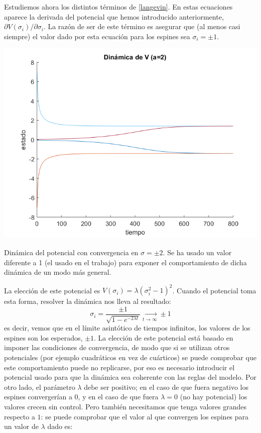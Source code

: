 \documentclass[titlepage,12pt]{article}
\numberwithin{equation}{section}
\begin{document}
	Estudiemos ahora los distintos términos de \eqref{langevin}. En estas ecuaciones aparece la derivada del potencial que hemos introducido anteriormente, ${\partial V(\sigma_i)}/{\partial \sigma_i}$. La razón de ser de este término es asegurar que (al menos casi siempre) el valor dado por esta ecuación para los espines sea $\sigma_i=\pm 1$.
	\begin{center}
	    \includegraphics[scale=0.5]{potencial}\\
	  \begin{small}
	  Dinámica del potencial con convergencia en $\sigma=\pm2$. Se ha usado un valor diferente a 1 (el usado en el trabajo) para exponer el comportamiento de dicha dinámica de un modo más general.
	\end{small}
	\end{center}
	La elección de este potencial es $V(\sigma_i)=\lambda\left(\sigma_i^2-1\right)^2$. Cuando el potencial toma esta forma, resolver la dinámica nos lleva al resultado:
	\begin{displaymath}
	\sigma_i = \frac{\pm 1}{\sqrt{1-e^{-2\lambda t}}} \xrightarrow[t \rightarrow \infty]{}\pm 1
	\end{displaymath}
	es decir, vemos que en el límite asintótico de tiempos infinitos, los valores de los espines son los esperados, $\pm 1$. La elección de este potencial está basado en imponer las condiciones de convergencia, de modo que si se utilizan otros potenciales (por ejemplo cuadráticos en vez de cuárticos) se puede comprobar que este comportamiento puede no replicarse, por eso es necesario introducir el potencial usado para que la dinámica sea coherente con las reglas del modelo. Por otro lado, el parámetro $\lambda$ debe ser positivo; en el caso de que fuera negativo los espines convergerían a $0$, y en el caso de que fuera $\lambda = 0$ (no hay potencial) los valores crecen sin control. Pero también necesitamos que tenga valores grandes respecto a $1$: se puede comprobar que el valor al que convergen los espines para un valor de $\lambda$ dado es:
\end{document}
